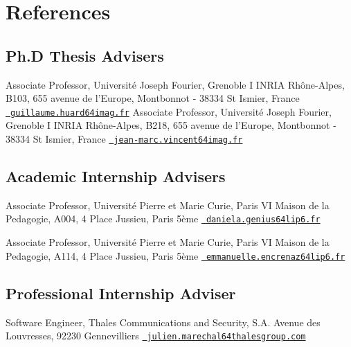 \documentclass[11pt,a4paper]{moderncv}
\begin{document}
   
\section{References}
\subsection{Ph.D Thesis Advisers}
{Associate Professor, Université Joseph Fourier, Grenoble I \newline
INRIA Rhône-Alpes, B103, 655 avenue de l'Europe, Montbonnot - 38334 St Ismier, France\newline
  \href{mailto:guillaume.huard@imag.fr}{\emailsymbol\ \footnotesize\texttt{guillaume.huard\char64imag.fr}}}
{Associate Professor, Université Joseph Fourier, Grenoble I \newline
INRIA Rhône-Alpes, B218, 655 avenue de l'Europe, Montbonnot - 38334 St Ismier, France\newline
  \href{mailto:jean-marc.vincent@imag.fr}{\emailsymbol\ \footnotesize\texttt{jean-marc.vincent\char64imag.fr}}}

  \subsection{Academic Internship Advisers}
%
{Associate Professor, Université Pierre et Marie Curie, Paris VI\newline
Maison de la Pedagogie, A004, 
4 Place Jussieu, Paris 5ème\newline
  \href{mailto:daniela.genius@lip6.fr}{\emailsymbol\ \footnotesize\texttt{daniela.genius\char64lip6.fr}}}
  
{Associate Professor, Université Pierre et Marie Curie, Paris VI\newline
Maison de la Pedagogie, A114, 
4 Place Jussieu, Paris 5ème\newline
  \href{mailto:emmanuelle.encrenze@lip6.fr}{\emailsymbol\ \footnotesize\texttt{emmanuelle.encrenaz\char64lip6.fr}}}
  
\subsection{Professional Internship Adviser}
{Software Engineer, Thales Communications and Security, S.A. Avenue des Louvresses, 92230 Gennevilliers\newline
  \href{mailto:julien.marechal@thalesgroup.com}{\emailsymbol\ \footnotesize\texttt{julien.marechal\char64thalesgroup.com}}}
\end{document}
